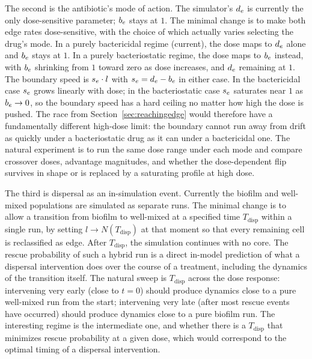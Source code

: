 The second is the antibiotic's mode of action. The simulator's $d_e$ is currently the only dose-sensitive parameter; $b_e$ stays at $1$. The minimal change is to make both edge rates dose-sensitive, with the choice of which actually varies selecting the drug's mode. In a purely bactericidal regime (current), the dose maps to $d_e$ alone and $b_e$ stays at $1$. In a purely bacteriostatic regime, the dose maps to $b_e$ instead, with $b_e$ shrinking from $1$ toward zero as dose increases, and $d_e$ remaining at $1$. The boundary speed is $s_e \cdot l$ with $s_e = d_e - b_e$ in either case. In the bactericidal case $s_e$ grows linearly with dose; in the bacteriostatic case $s_e$ saturates near $1$ as $b_e \to 0$, so the boundary speed has a hard ceiling no matter how high the dose is pushed. The race from Section~\ref{sec:reachingedge} would therefore have a fundamentally different high-dose limit: the boundary cannot run away from drift as quickly under a bacteriostatic drug as it can under a bactericidal one. The natural experiment is to run the same dose range under each mode and compare crossover doses, advantage magnitudes, and whether the dose-dependent flip survives in shape or is replaced by a saturating profile at high dose.

The third is dispersal as an in-simulation event. Currently the biofilm and well-mixed populations are simulated as separate runs. The minimal change is to allow a transition from biofilm to well-mixed at a specified time $T_{\mathrm{disp}}$ within a single run, by setting $l \to N(T_{\mathrm{disp}})$ at that moment so that every remaining cell is reclassified as edge. After $T_{\mathrm{disp}}$, the simulation continues with no core. The rescue probability of such a hybrid run is a direct in-model prediction of what a dispersal intervention does over the course of a treatment, including the dynamics of the transition itself. The natural sweep is $T_{\mathrm{disp}}$ across the dose response: intervening very early (close to $t = 0$) should produce dynamics close to a pure well-mixed run from the start; intervening very late (after most rescue events have occurred) should produce dynamics close to a pure biofilm run. The interesting regime is the intermediate one, and whether there is a $T_{\mathrm{disp}}$ that minimizes rescue probability at a given dose, which would correspond to the optimal timing of a dispersal intervention.
